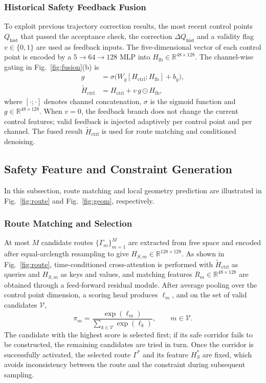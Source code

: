 \documentclass[journal]{IEEEtran}
\newcommand{\R}{\mathbb{R}}
\begin{document}
\subsubsection{Historical Safety Feedback Fusion}

To exploit previous trajectory correction results, the most recent control points $Q_{\mathrm{hist}}$ that passed the acceptance check, the correction $\Delta Q_{\mathrm{hist}}$ and a validity flag $v\in\{0,1\}$ are used as feedback inputs. The five-dimensional vector of each control point is encoded by a $5\!\rightarrow\!64\!\rightarrow\!128$ MLP into $H_{\mathrm{fb}}\in\R^{48\times128}$. The channel-wise gating in Fig.~\ref{fig:fusion}(b) is
\begin{equation}
\begin{aligned}
g&=\sigma\bigl(W_g[H_{\mathrm{ctrl}};H_{\mathrm{fb}}]+b_g\bigr),\\
\widetilde H_{\mathrm{ctrl}}
&=H_{\mathrm{ctrl}}+v\,g\odot H_{\mathrm{fb}},
\end{aligned}
\end{equation}
where $[\cdot;\cdot]$ denotes channel concatenation, $\sigma$ is the sigmoid function and $g\in\R^{48\times128}$. When $v=0$, the feedback branch does not change the current control features; valid feedback is injected adaptively per control point and per channel. The fused result $\widetilde H_{\mathrm{ctrl}}$ is used for route matching and conditioned denoising.

\subsection{Safety Feature and Constraint Generation}

In this subsection, route matching and local geometry prediction are illustrated in Fig.~\ref{fig:route} and Fig.~\ref{fig:geom}, respectively.

\subsubsection{Route Matching and Selection}

At most $M$ candidate routes $\{\Gamma_m\}_{m=1}^{M}$ are extracted from free space and encoded after equal-arclength resampling to give $H_{S,m}\in\R^{128\times128}$. As shown in Fig.~\ref{fig:route}, time-conditioned cross-attention is performed with $\widetilde H_{\mathrm{ctrl}}$ as queries and $H_{S,m}$ as keys and values, and matching features $R_m\in\R^{48\times128}$ are obtained through a feed-forward residual module. After average pooling over the control point dimension, a scoring head produces $\ell_m$, and on the set of valid candidates $\mathcal V$,
\begin{equation}
\pi_m=\frac{\exp(\ell_m)}{\sum_{k\in\mathcal V}\exp(\ell_k)},
\qquad m\in\mathcal V.
\end{equation}
The candidate with the highest score is selected first; if its safe corridor fails to be constructed, the remaining candidates are tried in turn. Once the corridor is successfully activated, the selected route $\Gamma^*$ and its feature $H_S^*$ are fixed, which avoids inconsistency between the route and the constraint during subsequent sampling.
\end{document}
